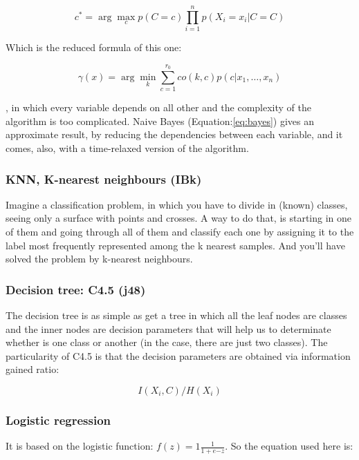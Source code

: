 \documentclass[conference,a4paper]{IEEEtran}
\begin{document}
\begin{equation}
	c^* = \arg \max_c p(C=c) \prod_{i=1}^{n} p(X_i = x_i|C = C)
	\label{eq:naive}
\end{equation}

Which is the reduced formula of this one:

\begin{equation}
	\gamma(x) = \arg \min_k \sum_{c=1}^{r_0} co (k,c) p(c| x_1,\dots, x_n)
	\label{eq:bayes}
\end{equation}

, in which every variable depends on all other and the complexity of the algorithm is too complicated. Naive Bayes (Equation:\ref{eq:bayes}) gives an approximate result, by reducing the dependencies between each variable, and it comes, also, with a time-relaxed version of the algorithm.

\subsubsection{KNN, K-nearest neighbours (IBk)}

Imagine a classification problem, in which you have to divide in (known) classes, seeing only a surface with points and crosses. A way to do that, is starting in one of them and going through all of them and
classify each one by assigning it to the label most frequently represented among the k nearest samples. And you'll have solved the problem by k-nearest neighbours.

\subsubsection{Decision tree: C4.5 (j48)}

The decision tree is as simple as get a tree in which all the leaf nodes are classes and the inner nodes are decision parameters that will help us to determinate whether is one class or another (in the case, there are just two classes). The particularity of C4.5\cite{c45} is that the decision parameters are obtained via information gained ratio:

\begin{equation}
	I(X_i,C)/H(X_i)
\end{equation}

\subsubsection{Logistic regression}

It is based on the logistic function: $f(z) = 1 \frac{1}{1+e{-z}}$. So the equation used here is:
\end{document}
